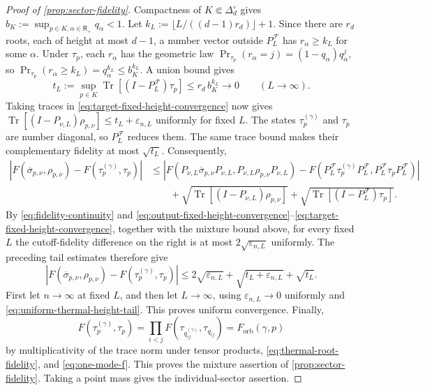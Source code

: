 \documentclass[11pt]{article}
\theoremstyle{remark}
\theoremstyle{plain}
\newcommand{\cF}{\mathcal F}
\newcommand{\Tr}{\operatorname{Tr}}
\newcommand{\Forb}{F_{\mathrm{orb}}}
\begin{document}
\begin{proof}[Proof of \cref{prop:sector-fidelity}]
Compactness of \(K\Subset\Delta_d^\circ\) gives
\(b_K:=\sup_{p\in K,\alpha\in\mathsf R_+}q_\alpha<1\).
Let \(k_L:=\lfloor L/((d-1)r_d)\rfloor+1\).
Since there are \(r_d\) roots, each of height at most \(d-1\), a
number vector outside \(P_L^{\cF}\) has \(r_\alpha\ge k_L\) for some
\(\alpha\).  Under \(\tau_p\), each \(r_\alpha\) has the geometric law
\(\Pr_{\tau_p}(r_\alpha=j)=(1-q_\alpha)q_\alpha^j\), so
\(\Pr_{\tau_p}(r_\alpha\ge k_L)=q_\alpha^{k_L}\le b_K^{k_L}\).
A union bound gives
\begin{equation}\label{eq:uniform-thermal-height-tail}
  t_L:=\sup_{p\in K}\Tr[(I-P_L^{\cF})\tau_p]
  \le
  r_d\,b_K^{k_L}
  \longrightarrow0\qquad(L\to\infty).
\end{equation}
Taking traces in
\eqref{eq:target-fixed-height-convergence} now gives
\(\Tr[(I-P_{\nu,L})\rho_{p,\nu}]\le t_L+\varepsilon_{n,L}\)
uniformly for fixed \(L\).  The states \(\tau_p^{(\gamma)}\) and
\(\tau_p\) are number diagonal, so \(P_L^{\cF}\) reduces them. The same
trace bound makes their
complementary fidelity at most \(\sqrt{t_L}\).  Consequently,
\[
\begin{aligned}
 \left|F(\overline\sigma_{p,\nu},\rho_{p,\nu})
       -F(\tau_p^{(\gamma)},\tau_p)\right|
 &\le
 \left|F(P_{\nu,L}\overline\sigma_{p,\nu}P_{\nu,L},
         P_{\nu,L}\rho_{p,\nu}P_{\nu,L})
       -F(P_L^{\cF}\tau_p^{(\gamma)}P_L^{\cF},
          P_L^{\cF}\tau_pP_L^{\cF})\right|\\
 &\qquad+
 \sqrt{\Tr[(I-P_{\nu,L})\rho_{p,\nu}]}
 +\sqrt{\Tr[(I-P_L^{\cF})\tau_p]}.
\end{aligned}
\]
By \eqref{eq:fidelity-continuity} and
\eqref{eq:output-fixed-height-convergence}--\eqref{eq:target-fixed-height-convergence},
together with the mixture bound above, for every fixed \(L\) the
cutoff-fidelity difference on the right is at most
\(2\sqrt{\varepsilon_{n,L}}\) uniformly.  The preceding tail estimates
therefore give
\[
  \left|F(\overline\sigma_{p,\nu},\rho_{p,\nu})
  -F(\tau_p^{(\gamma)},\tau_p)\right|
  \le 2\sqrt{\varepsilon_{n,L}}
     +\sqrt{t_L+\varepsilon_{n,L}}+\sqrt{t_L}.
\]
First let \(n\to\infty\) at fixed \(L\), and then let
\(L\to\infty\), using \(\varepsilon_{n,L}\to0\) uniformly and
\eqref{eq:uniform-thermal-height-tail}.  This proves uniform
convergence.  Finally,
\[
  F(\tau_p^{(\gamma)},\tau_p)
  =\prod_{i<j}F(\tau_{q_{ij}^{(\gamma)}},\tau_{q_{ij}})
  =\Forb(\gamma,p)
\]
by multiplicativity of the trace norm under tensor
products, \eqref{eq:thermal-root-fidelity}, and \eqref{eq:one-mode-f}.
This proves the mixture assertion of \cref{prop:sector-fidelity}.
Taking a point mass gives the individual-sector assertion.
\end{proof}
\end{document}
